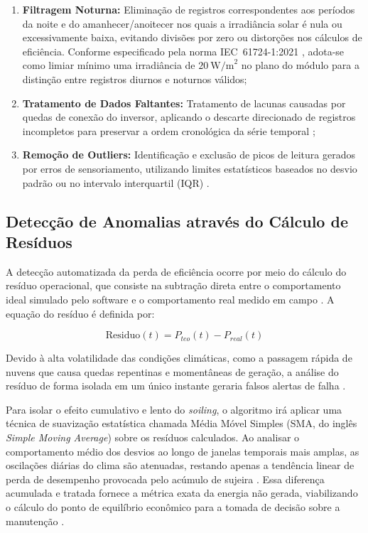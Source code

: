 \documentclass{UNESC}
\begin{document}
\begin{enumerate}
    \item \textbf{Filtragem Noturna:} Eliminação de registros
    correspondentes aos períodos da noite e do amanhecer/anoitecer nos
    quais a irradiância solar é nula ou excessivamente baixa, evitando
    divisões por zero ou distorções nos cálculos de eficiência. Conforme
    especificado pela norma IEC~61724-1:2021 \cite{iec61724_2021},
    adota-se como limiar mínimo uma irradiância de $20\ \text{W/m}^2$
    no plano do módulo para a distinção entre registros diurnos e
    noturnos válidos;

    \item \textbf{Tratamento de Dados Faltantes:} Tratamento de lacunas
    causadas por quedas de conexão do inversor, aplicando o descarte
    direcionado de registros incompletos para preservar a ordem cronológica
    da série temporal \cite{livera2021};

    \item \textbf{Remoção de Outliers:} Identificação e exclusão de picos
    de leitura gerados por erros de sensoriamento, utilizando limites
    estatísticos baseados no desvio padrão ou no intervalo interquartil
    (IQR) \cite{livera2021}.
\end{enumerate}

\subsection{Detecção de Anomalias através do Cálculo de Resíduos}

A detecção automatizada da perda de eficiência ocorre por meio do cálculo
do resíduo operacional, que consiste na subtração direta entre o
comportamento ideal simulado pelo software e o comportamento real medido
em campo \cite{lazzaretti2020monitoring}. A equação do resíduo é
definida por:

\begin{equation}
    \text{Residuo}(t) = P_{teo}(t) - P_{real}(t)
\end{equation}

Devido à alta volatilidade das condições climáticas, como a passagem
rápida de nuvens que causa quedas repentinas e momentâneas de geração,
a análise do resíduo de forma isolada em um único instante geraria
falsos alertas de falha \cite{debenedetti2018}.

Para isolar o efeito cumulativo e lento do \textit{soiling}, o algoritmo
irá aplicar uma técnica de suavização estatística chamada Média Móvel
Simples (SMA, do inglês \textit{Simple Moving Average}) sobre os resíduos
calculados. Ao analisar o comportamento médio dos desvios ao longo de
janelas temporais mais amplas, as oscilações diárias do clima são
atenuadas, restando apenas a tendência linear de perda de desempenho
provocada pelo acúmulo de sujeira \cite{kalimeris2023data, debenedetti2018}.
Essa diferença acumulada e tratada fornece a métrica exata da energia
não gerada, viabilizando o cálculo do ponto de equilíbrio econômico
para a tomada de decisão sobre a manutenção \cite{ilse2019}.
\end{document}
